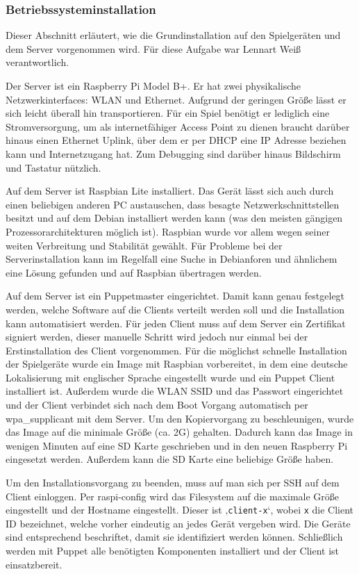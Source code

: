 \subsubsection{Betriebssysteminstallation}

Dieser Abschnitt erläutert, wie die Grundinstallation auf den Spielgeräten und dem Server
vorgenommen wird.
Für diese Aufgabe war Lennart Weiß verantwortlich.

Der Server ist ein Raspberry Pi Model B+.
Er hat zwei physikalische Netzwerkinterfaces: WLAN und Ethernet.
Aufgrund der geringen Größe lässt er sich leicht überall hin transportieren.
Für ein Spiel benötigt er lediglich eine Stromversorgung, um als internetfähiger Access Point zu
dienen braucht darüber hinaus einen Ethernet Uplink, über dem er per DHCP eine IP Adresse beziehen
kann und Internetzugang hat.
Zum Debugging sind darüber hinaus Bildschirm und Tastatur nützlich.

Auf dem Server ist Raspbian Lite installiert.
Das Gerät lässt sich auch durch einen beliebigen anderen PC austauschen, dass besagte
Netzwerkschnittstellen besitzt und auf dem Debian installiert werden kann (was den meisten gängigen
Prozessorarchitekturen möglich ist).
Raspbian wurde vor allem wegen seiner weiten Verbreitung und Stabilität gewählt.
Für Probleme bei der Serverinstallation kann im Regelfall eine Suche in Debianforen und ähnlichem
eine Lösung gefunden und auf Raspbian übertragen werden.

Auf dem Server ist ein Puppetmaster eingerichtet.
Damit kann genau festgelegt werden, welche Software auf die Clients verteilt werden soll und die
Installation kann automatisiert werden.
Für jeden Client muss auf dem Server ein Zertifikat signiert werden, dieser manuelle Schritt wird
jedoch nur einmal bei der Erstinstallation des Client vorgenommen.
Für die möglichst schnelle Installation der Spielgeräte wurde ein Image mit Raspbian vorbereitet, in
dem eine deutsche Lokalisierung mit englischer Sprache eingestellt wurde und ein Puppet Client
installiert ist.
Außerdem wurde die WLAN SSID und das Passwort eingerichtet und der Client verbindet sich nach dem
Boot Vorgang automatisch per wpa\_supplicant mit dem Server.
Um den Kopiervorgang zu beschleunigen, wurde das Image auf die minimale Größe (ca. 2G) gehalten.
Dadurch kann das Image in wenigen Minuten auf eine SD Karte geschrieben und in den neuen Raspberry
Pi eingesetzt werden.
Außerdem kann die SD Karte eine beliebige Größe haben.

Um den Installationsvorgang zu beenden, muss auf man sich per SSH auf dem Client einloggen.
Per raspi-config wird das Filesystem auf die maximale Größe eingestellt und der Hostname
eingestellt.
Dieser ist ‚\texttt{client-x}‘, wobei \texttt{x} die Client ID bezeichnet, welche vorher eindeutig
an jedes Gerät vergeben wird.
Die Geräte sind entsprechend beschriftet, damit sie identifiziert werden können.
Schließlich werden mit Puppet alle benötigten Komponenten installiert und der Client ist
einsatzbereit.

